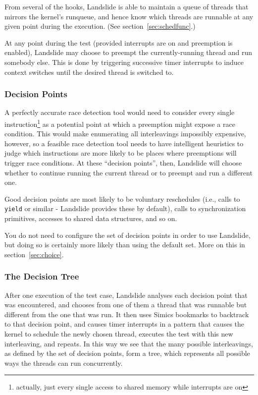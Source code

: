 \documentclass{article}
\begin{document}
From several of the hooks, Landslide is able to maintain a queue of threads that mirrors the kernel's runqueue, and hence know which threads are runnable at any given point during the execution. (See section~\ref{sec:schedfunc}.)

At any point during the test (provided interrupts are on and preemption is enabled), Landslide may choose to preempt the currently-running thread and run somebody else.
This is done by triggering successive timer interrupts to induce context switches until the desired thread is switched to.

\subsubsection{Decision Points}

A perfectly accurate race detection tool would need to consider every single instruction\footnote{actually, just every single access to shared memory while interrupts are on}
as a potential point at which a preemption might expose a race condition.
This would make enumerating all interleavings impossibly expensive, however, so a feasible race detection tool needs to have intelligent heuristics to judge which instructions are more likely to be places where preemptions will trigger race conditions. At these ``decision points'', then, Landslide will choose whether to continue running the current thread or to preempt and run a different one.

Good decision points are most likely to be voluntary reschedules (i.e., calls to \texttt{yield} or similar - Landslide provides these by default), calls to synchronization primitives, accesses to shared data structures, and so on.

You do not need to configure the set of decision points in order to use Landslide, but doing so is certainly more likely than using the default set. More on this in section~\ref{sec:choice}.

\subsubsection{The Decision Tree}

After one execution of the test case, Landslide analyses each decision point that was encountered, and chooses from one of them a thread that was runnable but different from the one that was run. It then uses Simics bookmarks to backtrack to that decision point, and causes timer interrupts in a pattern that causes the kernel to schedule the newly chosen thread, executes the test with this new interleaving, and repeats. In this way we see that the many possible interleavings, as defined by the set of decision points, form a tree, which represents all possible ways the threads can run concurrently.
\end{document}
